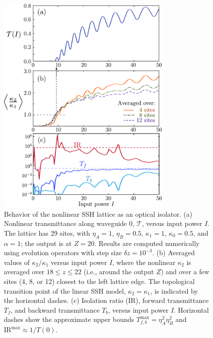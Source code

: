 \documentclass[aps,prx,twocolumn,superscriptaddress]{revtex4-1}
\newcommand{\figwidth}{8.6cm}
\begin{document}
\begin{figure}
  \centering
  \includegraphics[width=\figwidth]{TB/isolation.pdf}
  \caption{Behavior of the nonlinear SSH lattice as an optical isolator. (a) Nonlinear transmittance along waveguide 0, $\mathcal{T}$, versus input power $I$.  The lattice has 29 sites, with $\eta_A = 1$, $\eta_B= 0.5$, $\kappa_1=1$, $\kappa_0=0.5$, and $\alpha=1$; the output is at $Z = 20$.  Results are computed numerically using evolution operators with step size $\delta z = 10^{-3}$.  (b) Averaged values of $\kappa_2/\kappa_1$ versus input power $I$, where the nonlinear $\kappa_2$ is averaged over $18 \le z \le 22$ (i.e., around the output $Z$) and over a few sites (4, 8, or 12) closest to the left lattice edge.  The topological transition point of the linear SSH model, $\kappa_2 = \kappa_1$, is indicated by the horizontal dashes.  (c) Isolation ratio (IR), forward transmittance $T_f$, and backward transmittance $T_b$, versus input power $I$.  Horizontal dashes show the approximate upper bounds $T_{f,b}^{\mathrm{max}} = \eta_A^2 \eta_B^2$ and $\mathrm{IR}^{\mathrm{max}} \approx 1/T(0)$.}
\label{fig:isolation}
\end{figure}
\end{document}
